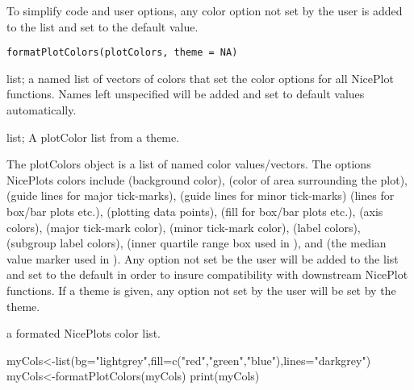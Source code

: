 \documentclass[a4paper]{book}
\begin{document}
%
\begin{Description}\relax
To simplify code and user options, any color option not set by the user is added to the list and set to the default value.
\end{Description}
%
\begin{Usage}
\begin{verbatim}
formatPlotColors(plotColors, theme = NA)
\end{verbatim}
\end{Usage}
%
\begin{Arguments}
\begin{ldescription}
\item[\code{plotColors}] list; a named list of vectors of colors that set the color options for all NicePlot functions. Names left unspecified will be added and set to default values automatically.

\item[\code{theme}] list; A  plotColor list from a theme.
\end{ldescription}
\end{Arguments}
%
\begin{Details}\relax
The  plotColors object is a list of named color values/vectors. The options NicePlots colors include  (background color),  (color of area surrounding the plot),  (guide lines for major tick-marks),  (guide lines for minor tick-marks)
 (lines for box/bar plots etc.),  (plotting data points),  (fill for box/bar plots etc.),  (axis colors),  (major tick-mark color),
 (minor tick-mark color),  (label colors),  (subgroup label colors),  (inner quartile range box used in ), and  (the median value marker used in ).
Any option not set be the user will be added to the list and set to the default in order to insure compatibility with downstream NicePlot functions.
If a theme is given, any option not set by the user will be set by the theme.
\end{Details}
%
\begin{Value}
a formated NicePlots color list.
\end{Value}
%
\begin{Examples}
\begin{ExampleCode}
myCols<-list(bg="lightgrey",fill=c("red","green","blue"),lines="darkgrey")
myCols<-formatPlotColors(myCols)
print(myCols)
\end{ExampleCode}
\end{Examples}
\end{document}
